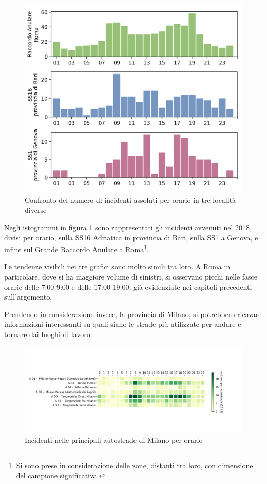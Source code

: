 \documentclass[a4paper]{report}
\begin{document}
\begin{figure}
    \includegraphics[width=\linewidth]{../src/incidenti/incidenti_aci/orari/orari.png}
    \caption{Confronto del numero di incidenti assoluti per orario in tre località diverse}
    \label{fig:orari-strade-aci}
\end{figure}

Negli istogrammi in figura \ref{fig:orari-strade-aci} sono rappresentati 
gli incidenti avvenuti 
nel 2018, divisi per orario, sulla SS16 Adriatica in provincia di Bari, sulla SS1 
a Genova, e infine sul Grande Raccordo Anulare a 
Roma\footnote{Si sono prese in considerazione delle zone, distanti tra loro, 
con dimensione del campione significativa.}. 

Le tendenze visibili nei tre grafici sono molto simili tra loro. 
A Roma in particolare, dove si ha maggiore 
volume di sinistri, si osservano picchi nelle fasce orarie delle 
7:00-9:00 e delle 17:00-19:00, già evidenziate nei capitoli precedenti sull'argomento. 

Prendendo in considerazione invece, la provincia di Milano, si potrebbero ricavare 
informazioni interessanti su quali siano le strade più utilizzate per 
andare e tornare dai luoghi di lavoro. 

\begin{figure}
    \includegraphics[width=\linewidth]{../src/incidenti/incidenti_aci/orari/tangenziali_autostrade.png}
    \caption{Incidenti nelle principali autostrade di Milano per orario}
    \label{fig:tangenziali-autostrade}
\end{figure}
\end{document}
